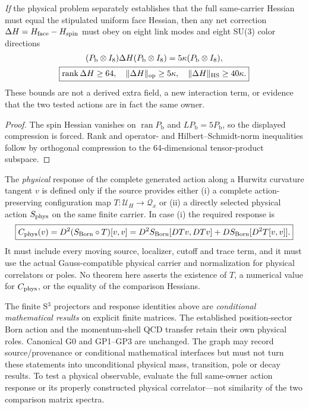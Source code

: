 \documentclass[12pt,a4paper]{article}
\begin{document}
\begin{proposition}
\label{p13:prop:s3-positive-face-matching-bound-v159}
\emph{If} the physical problem separately establishes that the full
same-carrier Hessian must equal the stipulated uniform face Hessian,
then any net correction $\Delta H=H_{\rm face}-H_{\rm spin}$
must obey on eight link modes and eight SU(3) color directions
\[
\begin{gathered}
(P_{\mathrm b}\otimes I_8)\Delta H(P_{\mathrm b}\otimes I_8)
=5\kappa(P_{\mathrm b}\otimes I_8),\\
\boxed{\operatorname{rank}\Delta H\ge64,\quad
\|\Delta H\|_{\rm op}\ge5\kappa,\quad
\|\Delta H\|_{\rm HS}\ge40\kappa.}
\end{gathered}
\]
These bounds are not a derived extra field, a new interaction term,
or evidence that the two tested actions are in fact the same owner.
\end{proposition}
\begin{proof}
The spin Hessian vanishes on $\operatorname{ran}P_{\mathrm b}$
and $LP_{\mathrm b}=5P_{\mathrm b}$, so the displayed compression
is forced.  Rank and operator- and Hilbert--Schmidt-norm inequalities
follow by orthogonal compression to the 64-dimensional tensor-product
subspace.
\end{proof}

\begin{definition}
\label{p13:def:s3-physical-response-target-v159}
The \emph{physical} response of the complete generated action along
a Hurwitz curvature tangent $v$ is defined only if the source
provides either (i) a complete action-preserving configuration map
$T:\mathcal U_H\to\mathcal Q_x$ or (ii) a directly selected
physical action $S_{\rm phys}$ on the same finite carrier.
In case (i) the required response is
\[
\boxed{C_{\rm phys}(v)=D^2(S_{\rm Born}\circ T)[v,v]
=D^2S_{\rm Born}[DTv,DTv]
 +DS_{\rm Born}[D^2T[v,v]].}
\]
It must include every moving source, localizer, cutoff and trace
term, and it must use the actual Gauss-compatible physical carrier
and normalization for physical correlators or poles.
No theorem here asserts the existence of $T$, a numerical value for
$C_{\rm phys}$, or the equality of the comparison Hessians.
\end{definition}
\begin{remark}
\label{p13:rem:s3-physical-stage-v159}
The finite S$^3$ projectors and response identities above are
\emph{conditional mathematical results} on explicit finite
matrices.  The established position-sector Born action and the
momentum-shell QCD transfer retain their own physical roles.
Canonical G0 and GP1--GP3 are unchanged.  The graph may record
source/provenance or conditional mathematical interfaces but must
not turn these statements into unconditional physical mass,
transition, pole or decay results.  To test a physical observable,
evaluate the full same-owner action response or its properly
constructed physical correlator—not similarity of the two
comparison matrix spectra.
\end{remark}
\end{document}

